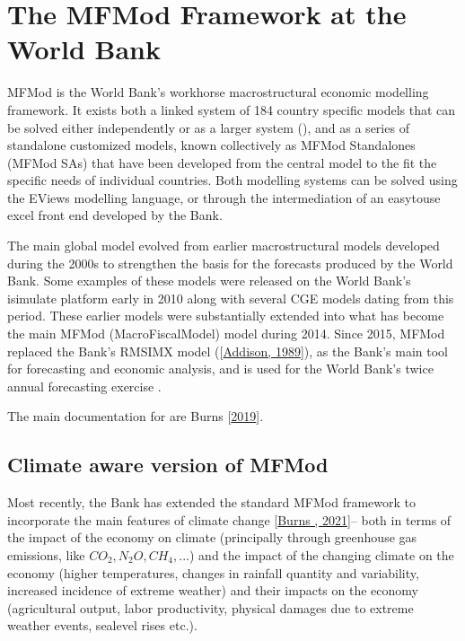 \documentclass[letterpaper,10pt,english]{jupyterBook}
\begin{document}
\section{The MFMod Framework at the World Bank}
\label{\detokenize{content/01_Introduction/Introduction:the-mfmod-framework-at-the-world-bank}}
\sphinxAtStartPar
MFMod is the World Bank’s work\sphinxhyphen{}horse macro\sphinxhyphen{}structural economic modelling framework. It exists both a linked system of 184 country specific models that can be solved either independently or as a larger system (), and as a series of  standalone customized models, known collectively as MFMod Standalones (MFMod SAs) that have been developed from the central model to the fit the specific needs of individual countries. Both modelling systems can be solved using the EViews modelling language, or through the intermediation of an easy\sphinxhyphen{}to\sphinxhyphen{}use excel front end developed by the Bank.

\sphinxAtStartPar
The main  global model evolved from earlier macro\sphinxhyphen{}structural models developed during the 2000s to strengthen the basis for the forecasts produced by the World Bank. Some examples of these models were released on the World Bank’s isimulate platform early in 2010 along with several CGE models dating from this period. These earlier models were substantially extended into what has become the main MFMod (MacroFiscalModel) model during 2014. Since 2015, MFMod replaced the Bank’s RMSIM\sphinxhyphen{}X model ({[}\hyperlink{cite.content/99_BackMatter/References:id20}{Addison, 1989}{]}), as the Bank’s main tool for forecasting and economic analysis, and is used for the World Bank’s twice annual forecasting exercise .

\sphinxAtStartPar
The main documentation for  are Burns  {[}\hyperlink{cite.content/99_BackMatter/References:id15}{2019}{]}.


\subsection{Climate aware version of MFMod}
\label{\detokenize{content/01_Introduction/Introduction:climate-aware-version-of-mfmod}}
\sphinxAtStartPar
Most recently, the Bank has extended the standard MFMod framework to incorporate the main features of climate change {[}\hyperlink{cite.content/99_BackMatter/References:id14}{Burns , 2021}{]}– both in terms of the impact of the economy on climate (principally through green\sphinxhyphen{}house gas emissions, like \(CO_2, N_{2}O, CH_4, ...\)) and the impact of the changing climate on the economy (higher temperatures, changes in rainfall quantity and variability, increased incidence of extreme weather) and their impacts on the economy (agricultural output, labor productivity, physical damages due to extreme weather events, sea\sphinxhyphen{}level rises etc.).
\end{document}
